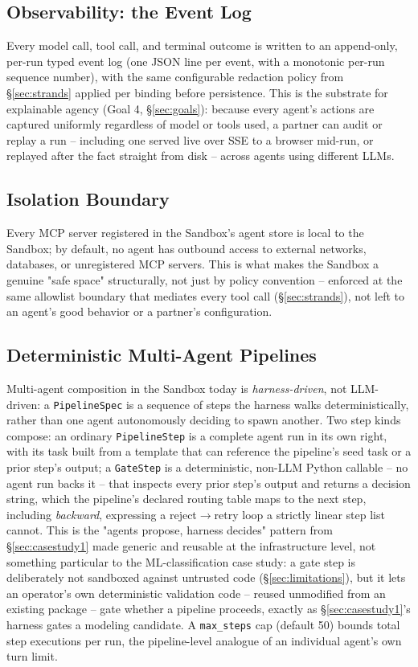 \documentclass[10pt,conference]{IEEEtran}
\begin{document}
\subsection{Observability: the Event Log}
Every model call, tool call, and terminal outcome is written to an
append-only, per-run typed event log (one JSON line per event, with a
monotonic per-run sequence number), with the same configurable redaction
policy from \S\ref{sec:strands} applied per binding before persistence. This
is the substrate for explainable agency (Goal 4, \S\ref{sec:goals}): because
every agent's actions are captured uniformly regardless of model or tools
used, a partner can audit or replay a run -- including one served live over
SSE to a browser mid-run, or replayed after the fact straight from disk --
across agents using different LLMs.

\subsection{Isolation Boundary}
Every MCP server registered in the Sandbox's agent store is local to the
Sandbox; by default, no agent has outbound access to external networks,
databases, or unregistered MCP servers. This is what makes the Sandbox a
genuine "safe space" structurally, not just by policy convention -- enforced
at the same allowlist boundary that mediates every tool call
(\S\ref{sec:strands}), not left to an agent's good behavior or a partner's
configuration.

\subsection{Deterministic Multi-Agent Pipelines}
\label{sec:pipelines}
Multi-agent composition in the Sandbox today is \emph{harness-driven}, not
LLM-driven: a \texttt{PipelineSpec} is a sequence of steps the harness walks
deterministically, rather than one agent autonomously deciding to spawn
another. Two step kinds compose: an ordinary \texttt{PipelineStep} is a
complete agent run in its own right, with its task built from a template
that can reference the pipeline's seed task or a prior step's output; a
\texttt{GateStep} is a deterministic, non-LLM Python callable -- no agent run
backs it -- that inspects every prior step's output and returns a decision
string, which the pipeline's declared routing table maps to the next
step, including \emph{backward}, expressing a reject$\to$retry loop a
strictly linear step list cannot. This is the "agents propose, harness
decides" pattern from \S\ref{sec:casestudy1} made generic and reusable at
the infrastructure level, not something particular to the ML-classification
case study: a gate step is deliberately not sandboxed against untrusted code
(\S\ref{sec:limitations}), but it lets an operator's own deterministic
validation code -- reused unmodified from an existing package -- gate
whether a pipeline proceeds, exactly as \S\ref{sec:casestudy1}'s harness
gates a modeling candidate. A \texttt{max\_steps} cap (default 50) bounds
total step executions per run, the pipeline-level analogue of an
individual agent's own turn limit.
\end{document}

